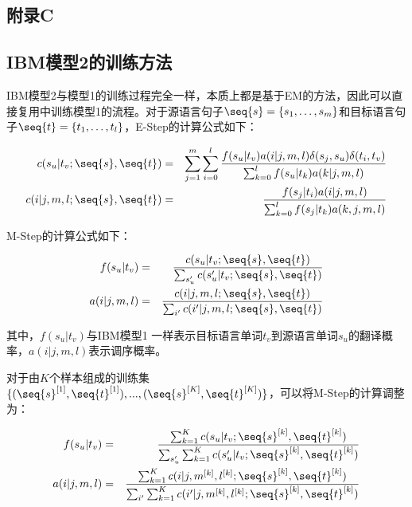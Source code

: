 \begin{appendices}
\chapter{附录C}
\label{appendix-C}


\section{IBM模型2的训练方法}

\parinterval IBM模型2与模型1的训练过程完全一样，本质上都是基于EM的方法，因此可以直接复用{\chapterfive}中训练模型1的流程。对于源语言句子$\seq{s}=\{s_1,\dots,s_m\}$和目标语言句子$\seq{t}=\{t_1,\dots,t_l\}$，E-Step的计算公式如下：

\begin{eqnarray}
c(s_u|t_v;\seq{s},\seq{t}) &=&\sum\limits_{j=1}^{m} \sum\limits_{i=0}^{l} \frac{f(s_u|t_v)a(i|j,m,l) \delta(s_j,s_u)\delta (t_i,t_v) }   {\sum_{k=0}^{l} f(s_u|t_k)a(k|j,m,l)} \\
c(i|j,m,l;\seq{s},\seq{t}) &=&\frac{f(s_j|t_i)a(i|j,m,l)}   {\sum_{k=0}^{l} f(s_j|t_k)a(k,j,m,l)}
\label{eq:append-1}
\end{eqnarray}

\noindent M-Step的计算公式如下：

\begin{eqnarray}
f(s_u|t_v) &=&\frac{c(s_u|t_v;\seq{s},\seq{t}) }    {\sum_{s'_u} c(s'_u|t_v;\seq{s},\seq{t})} \\
a(i|j,m,l) &=&\frac{c(i|j,m,l;\seq{s},\seq{t})}  {\sum_{i'}c(i'|j,m,l;\seq{s},\seq{t})}
\label{eq:append-2}
\end{eqnarray}

\noindent 其中，$f(s_u|t_v)$与IBM模型1 一样表示目标语言单词$t_v$到源语言单词$s_u$的翻译概率，$a(i|j,m,l)$表示调序概率。

\parinterval 对于由$K$个样本组成的训练集$\{(\seq{s}^{[1]},\seq{t}^{[1]}),...,(\seq{s}^{[K]},\seq{t}^{[K]})\}$，可以将M-Step的计算调整为：

\begin{eqnarray}
f(s_u|t_v) &=&\frac{\sum_{k=1}^{K}c(s_u|t_v;\seq{s}^{[k]},\seq{t}^{[k]}) }    {\sum_{s'_u} \sum_{k=1}^{K} c(s'_u|t_v;\seq{s}^{[k]},\seq{t}^{[k]})} \\
a(i|j,m,l) &=&\frac{\sum_{k=1}^{K}c(i|j,m^{[k]},l^{[k]};\seq{s}^{[k]},\seq{t}^{[k]})}  {\sum_{i'}\sum_{k=1}^{K}c(i'|j,m^{[k]},l^{[k]};\seq{s}^{[k]},\seq{t}^{[k]})}
\label{eq:append-3}
\end{eqnarray}


\end{appendices}
